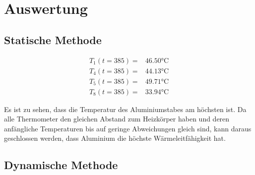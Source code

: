 \section{Auswertung}
\label{sec:Auswertung}


\subsection{Statische Methode}
\begin{align*}
T_1(t=385) =& 46.50 \si{\celsius}\\
T_4(t=385) =& 44.13 \si{\celsius}\\
T_5(t=385) =& 49.71 \si{\celsius}\\
T_8(t=385) =& 33.94 \si{\celsius}
\end{align*}

Es ist zu sehen, dass die Temperatur des Aluminiumstabes am höchsten ist. Da alle Thermometer den gleichen Abstand
zum Heizkörper haben und deren anfängliche Temperaturen bis auf geringe Abweichungen gleich sind, kann daraus 
geschlossen werden, dass Aluminium die höchste Wärmeleitfähigkeit hat.





\subsection{Dynamische Methode}

%
